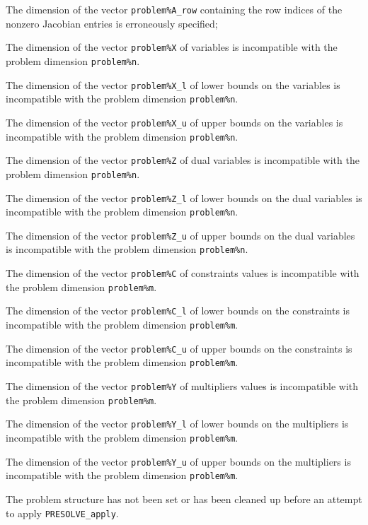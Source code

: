 \documentclass{galahad}
\newcommand{\packagename}{PRESOLVE}
\begin{document}
\begin{description}
 The dimension of the vector {\tt problem\%A\_row} containing the
row indices of the nonzero Jacobian entries is erroneously specified;

 The dimension of the vector {\tt problem\%X} of variables is
incompatible with the problem dimension {\tt problem\%n}.

 The dimension of the vector {\tt problem\%X\_l} of lower bounds on
the variables is incompatible with the problem dimension {\tt problem\%n}.

 The dimension of the vector {\tt problem\%X\_u} of upper bounds on
the variables is incompatible with the problem dimension {\tt problem\%n}.

 The dimension of the vector {\tt problem\%Z} of dual variables is
incompatible with the problem dimension {\tt problem\%n}.

 The dimension of the vector {\tt problem\%Z\_l} of lower bounds on
the dual variables is incompatible with the problem dimension {\tt problem\%n}.

 The dimension of the vector {\tt problem\%Z\_u} of upper bounds on
the dual variables is incompatible with the problem dimension {\tt problem\%n}.

 The dimension of the vector {\tt problem\%C} of constraints values is
incompatible with the problem dimension {\tt problem\%m}.

 The dimension of the vector {\tt problem\%C\_l} of lower bounds on
the constraints is incompatible with the problem dimension {\tt problem\%m}.

 The dimension of the vector {\tt problem\%C\_u} of upper bounds on
the constraints is incompatible with the problem dimension {\tt problem\%m}.

 The dimension of the vector {\tt problem\%Y} of multipliers values is
incompatible with the problem dimension {\tt problem\%m}.

 The dimension of the vector {\tt problem\%Y\_l} of lower bounds on
the multipliers is incompatible with the problem dimension {\tt problem\%m}.

 The dimension of the vector {\tt problem\%Y\_u} of upper bounds on
the multipliers is incompatible with the problem dimension {\tt problem\%m}.

 The problem structure has not been set or has been
cleaned up before an attempt to apply {\tt \packagename\_apply}.


\end{description}
\end{document}
